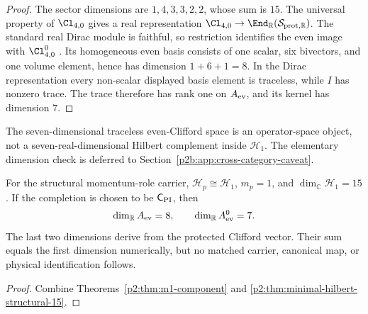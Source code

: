 \documentclass[11pt,a4paper]{article}
\begin{document}
\begin{proof}
The sector dimensions are \(1,4,3,3,2,2\), whose sum is \(15\).
The universal property of \(\Cl_{4,0}\) gives a real representation
\(\Cl_{4,0}\to\End_{\mathbb R}(\mathcal S_{{\rm prot},\mathbb R})\).
The standard real Dirac module is faithful, so restriction identifies the
even image with \(\Cl^0_{4,0}\)
\cite{lawson1989spin}.  Its homogeneous even basis consists of one scalar,
six bivectors, and one volume element, hence has dimension \(1+6+1=8\).
In the Dirac representation every non-scalar displayed basis element is
traceless, while \(I\) has nonzero trace.  The trace therefore has rank one
on \(A_{\rm ev}\), and its kernel has dimension \(7\).
\end{proof}

\begin{remark}
\label{p2:rem:no-seven-hilbert-complement-pointer}
The seven-dimensional traceless even-Clifford space is an operator-space
object, not a seven-real-dimensional Hilbert complement inside
\(\mathcal H_1\).  The elementary dimension check is deferred to
Section~\ref{p2b:app:cross-category-caveat}.
\end{remark}

\begin{corollary}
\label{p2:cor:protected-minimal-package-status}
For the structural momentum-role carrier,
\(\mathcal H_p\cong\mathcal H_1\), \(m_p=1\), and
\(\dim_{\mathbb C}\mathcal H_1=15\).  If the completion is chosen to be
\(\mathsf C_{\rm PI}\), then
\[
\dim_{\mathbb R}A_{\rm ev}=8,\qquad
\dim_{\mathbb R}A_{\rm ev}^{0}=7.
\]
The last two dimensions derive from the protected Clifford vector.  Their sum
equals the first dimension numerically, but no matched carrier, canonical map,
or physical identification follows.
\end{corollary}

\begin{proof}
Combine Theorems~\ref{p2:thm:m1-component} and
\ref{p2:thm:minimal-hilbert-structural-15}.
\end{proof}
\end{document}
